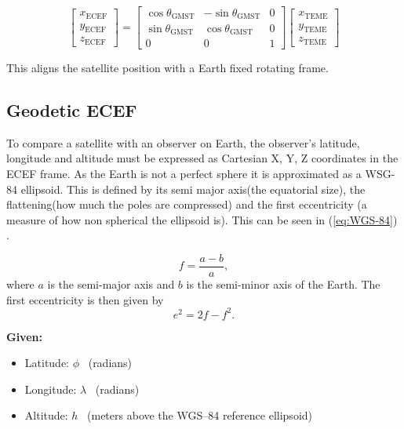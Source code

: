 \begin{equation}
\begin{bmatrix}
x_{\text{ECEF}} \\
y_{\text{ECEF}} \\
z_{\text{ECEF}}
\end{bmatrix}
=
\begin{bmatrix}
\cos\theta_{\text{GMST}} & -\sin\theta_{\text{GMST}} & 0 \\
\sin\theta_{\text{GMST}} &  \cos\theta_{\text{GMST}} & 0 \\
0                        &  0                        & 1
\end{bmatrix}
\begin{bmatrix}
x_{\text{TEME}} \\
y_{\text{TEME}} \\
z_{\text{TEME}}
\end{bmatrix}
\end{equation}

This aligns the satellite position with a Earth fixed rotating frame.

\subsection{Geodetic ECEF}
To compare a satellite with an observer on Earth, the observer's latitude, longitude and altitude must be expressed as Cartesian X, Y, Z coordinates in the ECEF frame. As the Earth is not a perfect sphere it is approximated as a WSG-84 ellipsoid. This is defined by its semi major axis(the equatorial size), the flattening(how much the poles are compressed) and the first eccentricity (a measure of how non spherical the ellipsoid is). This can be seen in (\ref{eq:WGS-84}) \cite{WGS84_ECEF_Conversion}.

\begin{equation}\label{eq:WGS-84}
f = \frac{a - b}{a},
\end{equation}
where $a$ is the semi-major axis and $b$ is the semi-minor axis of the Earth. The first eccentricity is then given by
\begin{equation}
e^2 = 2f - f^2.
\end{equation}

\noindent\textbf{Given:}
\begin{itemize}
    \item Latitude: $\phi$ \, (radians)
    \item Longitude: $\lambda$ \, (radians)
    \item Altitude: $h$ \, (meters above the WGS--84 reference ellipsoid)
\end{itemize}
 

